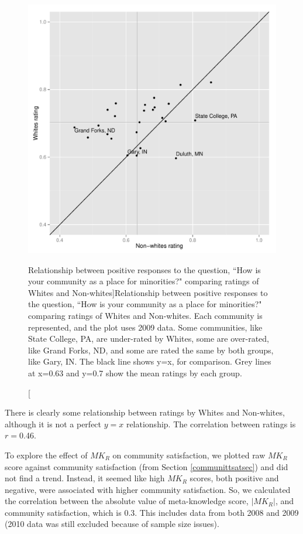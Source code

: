 \documentclass[smallextended]{svjour3}\usepackage[]{graphicx}\usepackage[]{color}
\newenvironment{knitrout}{}{} %
\begin{document}
\begin{knitrout}
\color{fgcolor}\begin{figure}

{\centering \includegraphics[width=0.76\linewidth]{figure/anotherlookplot-1} 

}

\caption[Relationship between positive responses to the question, ``How is your community as a place for minorities?" comparing ratings of Whites and Non-whites]{Relationship between positive responses to the question, ``How is your community as a place for minorities?" comparing ratings of Whites and Non-whites. Each community is represented, and the plot uses 2009 data. Some communities, like State College, PA, are under-rated by Whites, some are over-rated, like Grand Forks, ND, and some are rated the same by both groups, like Gary, IN. The black line shows y=x, for comparison. Grey lines at x=0.63 and y=0.7 show the mean ratings by each group.}\label{fig:anotherlookplot}
\end{figure}


\end{knitrout}

There is clearly some relationship between ratings by Whites and Non-whites, although it is not a perfect $y=x$ relationship. The correlation between ratings is $r= $0.46.



To explore the effect of $MK_R$ on community satisfaction, we plotted raw $MK_R$ score against community satisfaction (from Section \ref{communittsatsec}) and did not find a trend. Instead, it seemed like high $MK_R$ scores, both positive and negative, were associated with higher community satisfaction. So, we calculated the correlation between the absolute value of meta-knowledge score, $|MK_R|$, and community satisfaction, which is 0.3. This includes data from both 2008 and 2009 (2010 data was still excluded because of sample size issues). 
\end{document}
